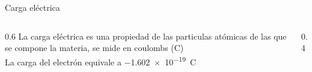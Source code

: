 \documentclass[aspectratio=169]{beamer}
\begin{document}
\begin{frame}{Carga eléctrica} 
    \begin{columns}[onlytextwidth]
    \begin{column}{0.6\textwidth}
        La carga eléctrica es una propiedad de las particulas atómicas de las que se compone la materia, se mide en coulombs (\si{\coulomb})\\[4pt]
        La carga del electrón equivale a \SI{-1.602e-19}{C}
    \end{column}
    \begin{column}{0.4\textwidth}
        \begin{center}
        \end{center}
    \end{column}
    \end{columns}
\end{frame}
\end{document}
